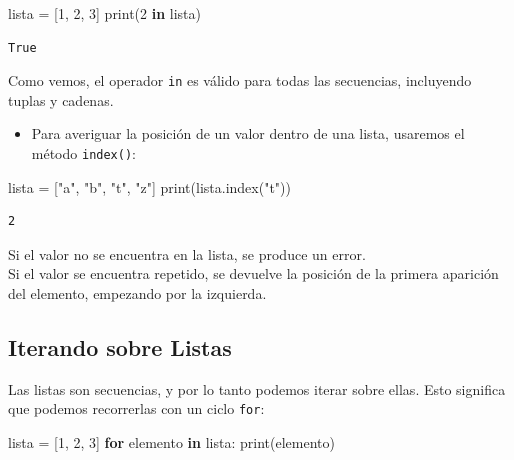 \documentclass[
  letterpaper,
  DIV=11,
  numbers=noendperiod]{scrreprt}
\newenvironment{Shaded}{\begin{snugshade}}{\end{snugshade}}
\newcommand{\BuiltInTok}[1]{\textcolor[rgb]{0.00,0.23,0.31}{#1}}
\newcommand{\ControlFlowTok}[1]{\textcolor[rgb]{0.00,0.23,0.31}{\textbf{#1}}}
\newcommand{\DecValTok}[1]{\textcolor[rgb]{0.68,0.00,0.00}{#1}}
\newcommand{\KeywordTok}[1]{\textcolor[rgb]{0.00,0.23,0.31}{\textbf{#1}}}
\newcommand{\NormalTok}[1]{\textcolor[rgb]{0.00,0.23,0.31}{#1}}
\newcommand{\OperatorTok}[1]{\textcolor[rgb]{0.37,0.37,0.37}{#1}}
\newcommand{\StringTok}[1]{\textcolor[rgb]{0.13,0.47,0.30}{#1}}
\providecommand{\tightlist}{%
  \setlength{\itemsep}{0pt}\setlength{\parskip}{0pt}}\usepackage{longtable,booktabs,array}
\begin{document}
\begin{Shaded}
\begin{Highlighting}[]
\NormalTok{lista }\OperatorTok{=}\NormalTok{ [}\DecValTok{1}\NormalTok{, }\DecValTok{2}\NormalTok{, }\DecValTok{3}\NormalTok{]}
\BuiltInTok{print}\NormalTok{(}\DecValTok{2} \KeywordTok{in}\NormalTok{ lista)}
\end{Highlighting}
\end{Shaded}

\begin{verbatim}
True
\end{verbatim}

Como vemos, el operador \texttt{in} es válido para todas las secuencias,
incluyendo tuplas y cadenas.

\begin{itemize}
\tightlist
\item
  Para averiguar la posición de un valor dentro de una lista, usaremos
  el método \texttt{index()}:
\end{itemize}

\begin{Shaded}
\begin{Highlighting}[]
\NormalTok{lista }\OperatorTok{=}\NormalTok{ [}\StringTok{"a"}\NormalTok{, }\StringTok{"b"}\NormalTok{, }\StringTok{"t"}\NormalTok{, }\StringTok{"z"}\NormalTok{]}
\BuiltInTok{print}\NormalTok{(lista.index(}\StringTok{"t"}\NormalTok{))}
\end{Highlighting}
\end{Shaded}

\begin{verbatim}
2
\end{verbatim}

Si el valor no se encuentra en la lista, se produce un error.\\
Si el valor se encuentra repetido, se devuelve la posición de la primera
aparición del elemento, empezando por la izquierda.

\subsection{Iterando sobre Listas}\label{iterando-sobre-listas}

Las listas son secuencias, y por lo tanto podemos iterar sobre ellas.
Esto significa que podemos recorrerlas con un ciclo \texttt{for}:

\begin{Shaded}
\begin{Highlighting}[]
\NormalTok{lista }\OperatorTok{=}\NormalTok{ [}\DecValTok{1}\NormalTok{, }\DecValTok{2}\NormalTok{, }\DecValTok{3}\NormalTok{]}
\ControlFlowTok{for}\NormalTok{ elemento }\KeywordTok{in}\NormalTok{ lista:}
    \BuiltInTok{print}\NormalTok{(elemento)}
\end{Highlighting}
\end{Shaded}
\end{document}
